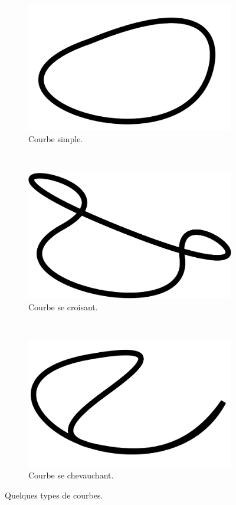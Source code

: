 \begin{figure}[htb]
	\centering
	 \begin{subfigure}[t]{0.25\textwidth}	
			\includegraphics[width=\textwidth]{images/etat-de-l-art/courbe3}
		 \caption{Courbe simple.}
			\label{fig:sota:courbeSimp}
	\end{subfigure}
	~
	 \begin{subfigure}[t]{0.25\textwidth}	
			\includegraphics[width=\textwidth]{images/etat-de-l-art/courbe2}
		 \caption{Courbe se croisant.}
			\label{fig:sota:courbeX}
	\end{subfigure}
	~
	 \begin{subfigure}[t]{0.25\textwidth}	
			\includegraphics[width=\textwidth]{images/etat-de-l-art/courbe1}
		 \caption{Courbe se chevauchant. }
			\label{fig:sota:courbeChe}
	\end{subfigure}
	\caption{Quelques types de courbes.}
	\label{fig:sota:courbes}
\end{figure}

